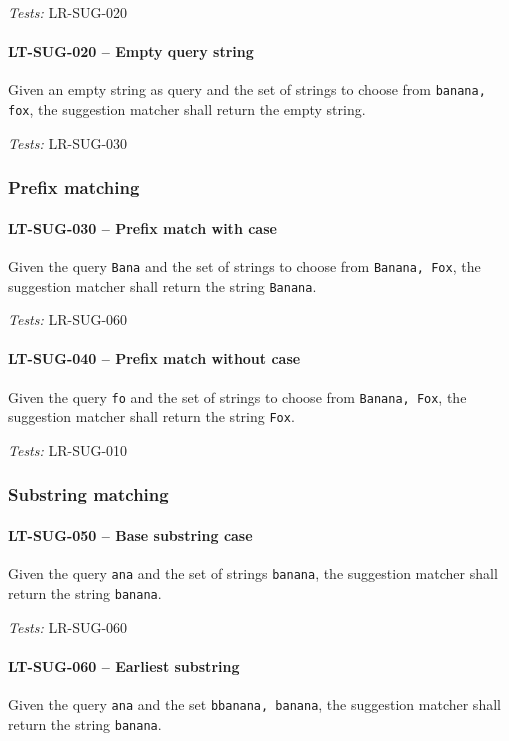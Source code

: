 \textit{Tests: } LR-SUG-020

\paragraph{LT-SUG-020 -- Empty query string}
Given an empty string as query and the set of strings to choose
from \lstinline{banana, fox}, the suggestion matcher shall
return the empty string.

\textit{Tests: } LR-SUG-030

\subsubsection{Prefix matching}
\paragraph{LT-SUG-030 -- Prefix match with case}
Given the query \lstinline{Bana} and the set of strings to choose
from \lstinline{Banana, Fox}, the suggestion matcher shall
return the string \lstinline{Banana}.

\textit{Tests: } LR-SUG-060

\paragraph{LT-SUG-040 -- Prefix match without case}
Given the query \lstinline{fo} and the set of strings to choose from
\lstinline{Banana, Fox}, the suggestion matcher shall return
the string \lstinline{Fox}.

\textit{Tests: } LR-SUG-010

\subsubsection{Substring matching}
\paragraph{LT-SUG-050 -- Base substring case}
Given the query \lstinline{ana} and the set of strings
\lstinline{banana}, the suggestion matcher shall return the
string \lstinline{banana}.

\textit{Tests: } LR-SUG-060

\paragraph{LT-SUG-060 -- Earliest substring}
Given the query \lstinline{ana} and the set \lstinline{bbanana, banana},
the suggestion matcher shall return the string \lstinline{banana}.

